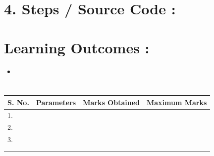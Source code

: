 \documentclass[14pt]{extarticle}
\begin{document}



\newpage
\section*{\normalsize 4. Steps / Source Code :}


 




\section*{\normalsize Learning Outcomes :}
  
  \begin{itemize}
    \item 
  \end{itemize}

\section*{}

\begin{center}

\begin{tabular}{ |p{2.5cm}|p{4cm}|p{5cm}|p{5cm}|} 
 \hline
 S. No. & Parameters & Marks Obtained & Maximum Marks \\
 \hline
 1.&&&\\
 \hline
 2.&&&\\
 \hline
 3.&&&\\
 \hline
 &&&\\
 &&&\\
 \hline
\end{tabular}
\end{center}
\end{document}
